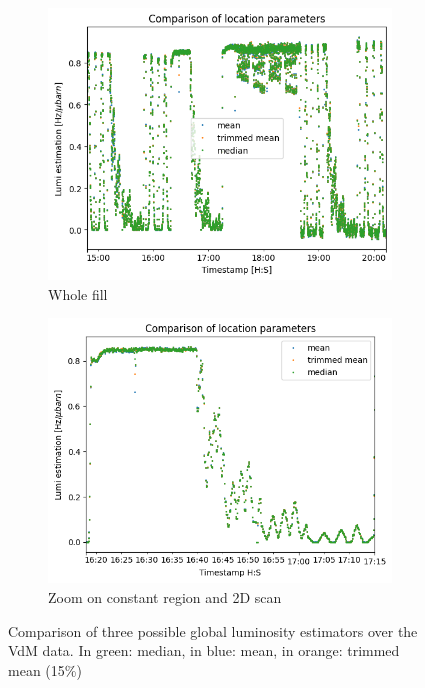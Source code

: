 \begin{figure}
    \centering
    \begin{subfigure}{0.48\textwidth}
    \includegraphics[width=\linewidth]{figures/comparison_location_whole.png}
    \caption{Whole fill}\label{fig:comparison_whole}
    \end{subfigure}
    \begin{subfigure}{0.48\textwidth}
    \includegraphics[width=\linewidth]{figures/comparison_location.png}
    \caption{Zoom on constant region and 2D scan}\label{fig:comparison_zoom}
    \end{subfigure}
    \caption{Comparison of three possible global luminosity estimators over the VdM data. In green: median, in blue: mean, in orange: trimmed mean (15\%)}
    \label{fig:lumi_estimator_location_param}
\end{figure}

